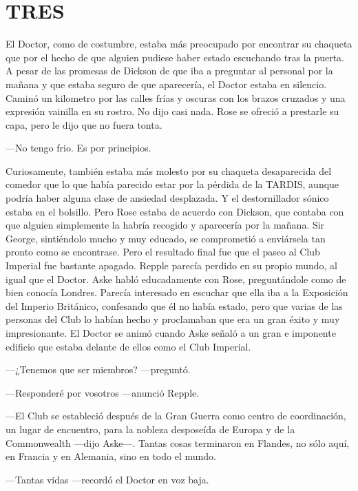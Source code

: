 \chapter*{TRES}

{El Doctor, como de costumbre, estaba más preocupado por encontrar su
	chaqueta que por el hecho de que alguien pudiese haber estado escuchando
	tras la puerta. A pesar de las promesas de Dickson de que iba a
	preguntar al personal por la mañana y que estaba seguro de que
	aparecería, el Doctor estaba en silencio. Caminó un kilometro por las
	calles frías y oscuras con los brazos cruzados y una expresión vainilla
	en su rostro. No dijo casi nada. Rose se ofreció a prestarle su capa,
pero le dijo que no fuera tonta.}

{---No tengo frio. Es por principios.}

{Curiosamente, también estaba más molesto por su chaqueta desaparecida
	del comedor que lo que había parecido estar por la pérdida de la TARDIS,
	aunque podría haber alguna clase de ansiedad desplazada. Y el
	destornillador sónico estaba en el bolsillo. Pero Rose estaba de acuerdo
	con Dickson, que contaba con que alguien simplemente la habría recogido
	y aparecería por la mañana. Sir George, sintiéndolo mucho y muy educado,
	se comprometió a enviársela tan pronto como se encontrase. Pero el
	resultado final fue que el paseo al Club Imperial fue bastante apagado.
	Repple parecía perdido en su propio mundo, al igual que el Doctor. Aske
	habló educadamente con Rose, preguntándole como de bien conocía Londres.
	Parecía interesado en escuchar que ella iba a la Exposición del Imperio
	Británico, confesando que él no había estado, pero que varias de las
	personas del Club lo habían hecho y proclamaban que era un gran éxito y
	muy impresionante. El Doctor se animó cuando Aske señaló a un gran e
imponente edificio que estaba delante de ellos como el Club Imperial.}

{---¿Tenemos que ser miembros? ---preguntó.}

{---Responderé por vosotros ---anunció Repple.}

{---El Club se estableció después de la Gran Guerra como centro de
	coordinación, un lugar de encuentro, para la nobleza desposeída de
	Europa y de la Commonwealth ---dijo Aske---. Tantas cosas terminaron en
Flandes, no sólo aquí, en Francia y en Alemania, sino en todo el mundo.}

{---Tantas vidas ---recordó el Doctor en voz baja.}

